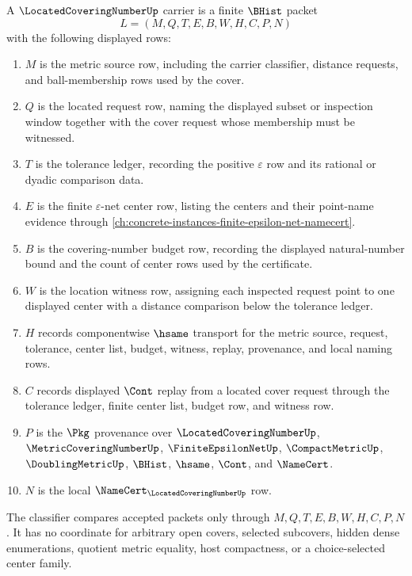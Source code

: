 \begin{definition}
\label{def:located-covering-number-carrier}
A $\LocatedCoveringNumberUp$ carrier is a finite $\BHist$ packet
$$
L=(M,Q,T,E,B,W,H,C,P,N)
$$
with the following displayed rows:
\begin{enumerate}
\item $M$ is the metric source row, including the carrier classifier, distance requests, and ball-membership rows used by the cover.
\item $Q$ is the located request row, naming the displayed subset or inspection window together with the cover request whose membership must be witnessed.
\item $T$ is the tolerance ledger, recording the positive $\varepsilon$ row and its rational or dyadic comparison data.
\item $E$ is the finite $\varepsilon$-net center row, listing the centers and their point-name evidence through \autoref{ch:concrete-instances-finite-epsilon-net-namecert}.
\item $B$ is the covering-number budget row, recording the displayed natural-number bound and the count of center rows used by the certificate.
\item $W$ is the location witness row, assigning each inspected request point to one displayed center with a distance comparison below the tolerance ledger.
\item $H$ records componentwise $\hsame$ transport for the metric source, request, tolerance, center list, budget, witness, replay, provenance, and local naming rows.
\item $C$ records displayed $\Cont$ replay from a located cover request through the tolerance ledger, finite center list, budget row, and witness row.
\item $P$ is the $\Pkg$ provenance over $\LocatedCoveringNumberUp$, $\MetricCoveringNumberUp$, $\FiniteEpsilonNetUp$, $\CompactMetricUp$, $\DoublingMetricUp$, $\BHist$, $\hsame$, $\Cont$, and $\NameCert$.
\item $N$ is the local $\NameCert_{\LocatedCoveringNumberUp}$ row.
\end{enumerate}
The classifier compares accepted packets only through $M,Q,T,E,B,W,H,C,P,N$. It has no coordinate for arbitrary open covers, selected subcovers, hidden dense enumerations, quotient metric equality, host compactness, or a choice-selected center family.
\end{definition}

